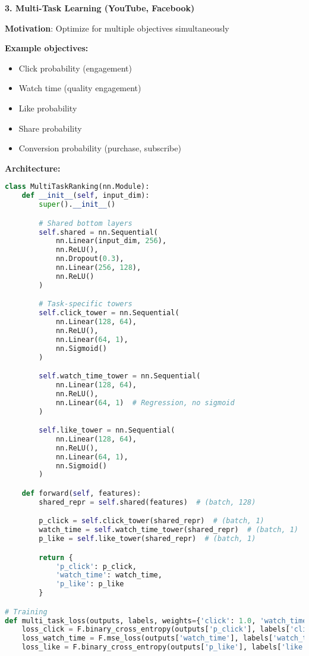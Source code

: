 \documentclass[10pt]{article}
\begin{document}
\textbf{3. Multi-Task Learning (YouTube, Facebook)}

\textbf{Motivation}: Optimize for multiple objectives simultaneously

\textbf{Example objectives:}
\begin{itemize}
\item Click probability (engagement)
\item Watch time (quality engagement)
\item Like probability
\item Share probability
\item Conversion probability (purchase, subscribe)
\end{itemize}

\textbf{Architecture:}
\begin{lstlisting}[language=Python]
class MultiTaskRanking(nn.Module):
    def __init__(self, input_dim):
        super().__init__()

        # Shared bottom layers
        self.shared = nn.Sequential(
            nn.Linear(input_dim, 256),
            nn.ReLU(),
            nn.Dropout(0.3),
            nn.Linear(256, 128),
            nn.ReLU()
        )

        # Task-specific towers
        self.click_tower = nn.Sequential(
            nn.Linear(128, 64),
            nn.ReLU(),
            nn.Linear(64, 1),
            nn.Sigmoid()
        )

        self.watch_time_tower = nn.Sequential(
            nn.Linear(128, 64),
            nn.ReLU(),
            nn.Linear(64, 1)  # Regression, no sigmoid
        )

        self.like_tower = nn.Sequential(
            nn.Linear(128, 64),
            nn.ReLU(),
            nn.Linear(64, 1),
            nn.Sigmoid()
        )

    def forward(self, features):
        shared_repr = self.shared(features)  # (batch, 128)

        p_click = self.click_tower(shared_repr)  # (batch, 1)
        watch_time = self.watch_time_tower(shared_repr)  # (batch, 1)
        p_like = self.like_tower(shared_repr)  # (batch, 1)

        return {
            'p_click': p_click,
            'watch_time': watch_time,
            'p_like': p_like
        }

# Training
def multi_task_loss(outputs, labels, weights={'click': 1.0, 'watch_time': 0.5, 'like': 0.3}):
    loss_click = F.binary_cross_entropy(outputs['p_click'], labels['click'])
    loss_watch_time = F.mse_loss(outputs['watch_time'], labels['watch_time'])
    loss_like = F.binary_cross_entropy(outputs['p_like'], labels['like'])


\end{lstlisting}
\end{document}
